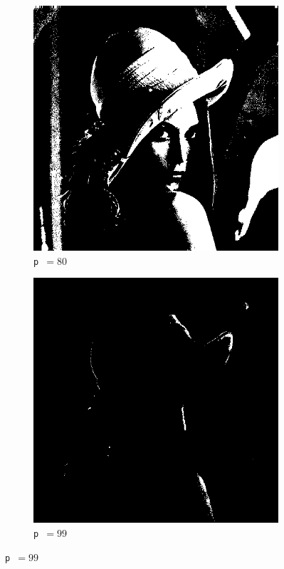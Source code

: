 \documentclass[12pt]{article}
\begin{document}
\begin{figure}[H]
      \vspace{0.02\textwidth}

      \begin{subfigure}[b]{0.33\textwidth}
        \centering
        \includegraphics[width=\textwidth]{img/lena-threshold-80.png}
        \caption*{\texttt{p }\( = 80\)}
      \end{subfigure}
      \hspace{0.15\textwidth}
      \begin{subfigure}[b]{0.33\textwidth}
        \centering
        \includegraphics[width=\textwidth]{img/lena-threshold-99.png}
        \caption*{\texttt{p }\( = 99\)}
      \end{subfigure}
    \end{figure}
\end{document}
